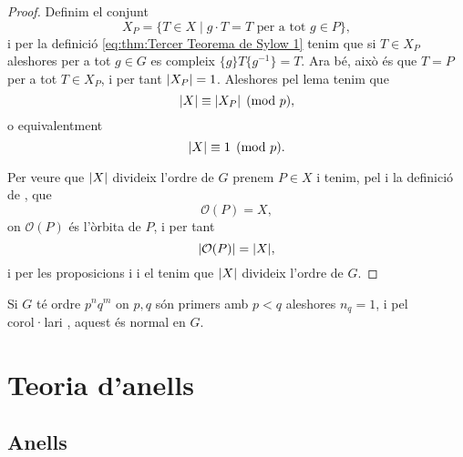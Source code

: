 \documentclass[../Apunts.tex]{subfiles}
\begin{document}
\begin{theorem}
\begin{proof}
			Definim el conjunt
			\[X_{P}=\{T\in X\mid g\cdot T=T\text{ per a tot }g\in P\},\]
			i per la definició \eqref{eq:thm:Tercer Teorema de Sylow 1} tenim que si \(T\in X_{P}\) aleshores per a tot \(g\in G\) es compleix \(\{g\}T\{g^{-1}\}=T\). Ara bé, això és que \(T=P\) per a tot \(T\in X_{P}\), i per tant \(\abs{X_{P}}=1\). Aleshores pel lema  tenim que
			\[\abs{X}\equiv\abs{X_{P}}\pmod{p},\]
			o equivalentment
			\[\abs{X}\equiv1\pmod{p}.\]
			
			Per veure que \(\abs{X}\) divideix l'ordre de \(G\) prenem \(P\in X\) i tenim, pel  i la definició de , que
			\[\mathcal{O}(P)=X,\]
			on \(\mathcal{O}(P)\) és l'òrbita de \(P\), i per tant
			\[\abs{\mathcal{O}(P)}=\abs{X},\]
			i per les proposicions  i  i el  tenim que \(\abs{X}\) divideix l'ordre de \(G\).
		\end{proof}
	\end{theorem}
	\begin{corollary}
		Si \(G\) té ordre \(p^{n}q^{m}\) on \(p,q\) són primers amb \(p<q\) aleshores \(n_{q}=1\), i pel corol·lari , aquest és normal en \(G\).
	\end{corollary}
	\chapter{Teoria d'anells}
	\section{Anells}
\end{document}
